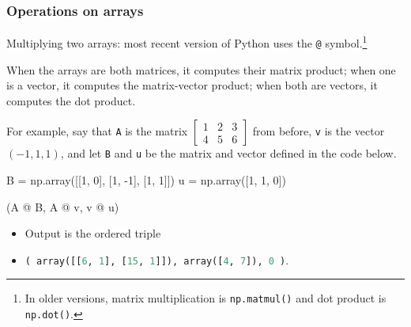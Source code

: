 \documentclass{beamer}
\newenvironment{codeblock}
    {\hfill\begin{beamerboxesrounded}[lower=codecol, width=0.8\textwidth]
    \medskip

    }
    { 
    \end{beamerboxesrounded}\hfill
    }
\theoremstyle{example}
\newcommand{\ct}[1]{\lstinline[language=Python]!#1!}
\newcommand{\ttt}[1]{{\small\texttt{#1}}}
\begin{document}
\begin{frame}[fragile]
\frametitle{Operations on arrays}

Multiplying two arrays: most recent version of Python uses the \ttt{@} symbol.\footnote{In older versions, matrix multiplication is \ttt{np.matmul()} and dot product is \ttt{np.dot()}.} 

When the arrays are both matrices, it computes their matrix product; when one is a vector, it computes the matrix-vector product; when both are vectors, it computes the dot product.


\pause
For example, say that \ttt{A} is the matrix $\begin{bmatrix}1 & 2 & 3 \\ 4 & 5 & 6\end{bmatrix}$ from before, \ttt{v} is the vector $(-1, 1, 1)$, and let \ttt{B} and \ttt{u} be the matrix and vector defined in the code below.

\vspace*{12pt}
\begin{codeblock}

\begin{python}
B = np.array([[1, 0], [1, -1], [1, 1]])
u = np.array([1, 1, 0])

(A @ B, A @ v, v @ u)
\end{python}

\end{codeblock}
\pause
\begin{itemize}
    \item Output is the ordered triple 
    \item[] \qquad \ct{( array([[6, 1], [15, 1]]), array([4, 7]), 0 )}.
\end{itemize}
\vspace*{12pt}

\end{frame}
\end{document}
